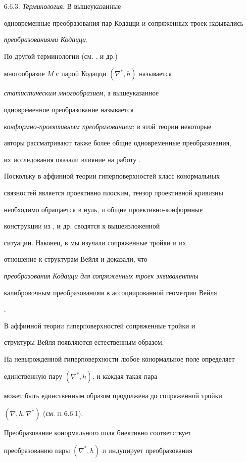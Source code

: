 6.6.3. {\it Терминология}. В \cite{BOK-G-S-2} вышеуказанные

одновременные преобразования пар Кодацци и сопряженных троек назывались

{\it преобразованиями Кодацци}.

По другой терминологии (см. \cite{KUR}, \cite{MAT} и др.)

многообразие $M$ с парой Кодацци $(\nabla ^*, h)$ называется

{\it статистическим многообразием}, а вышеуказанное

одновременное преобразование называется

{\it конформно-проективным преобразованием}; в этой теории некоторые

авторы рассматривают также более общие одновременные преобразования,

их исследования оказали влияние на работу \cite{STE}.

Поскольку в аффинной теории гиперповерхностей класс конормальных

связностей является проективно плоским, тензор проективной кривизны

необходимо обращается в нуль, и общие проективно-конформные

конструкции из \cite{KUR}, \cite{MAT} и др. сводятся к вышеизложенной

ситуации. Наконец, в \cite{BOK-G-S-2} мы изучали сопряженные тройки и их

отношение к структурам Вейля и доказали, что

{\it преобразования Кодацци для сопряженных троек эквивалентны

калибровочным преобразованиям в ассоциированной геометрии Вейля}.



В аффинной теории гиперповерхностей сопряженные тройки и

структуры Вейля появляются естественным образом.

На невырожденной гиперповерхности любое конормальное поле определяет

единственную пару $(\nabla^*, h)$, и каждая такая пара

может быть единственным образом продолжена до сопряженной тройки

$(\nabla, h,\nabla^*)$ (см. п.\,6.6.1).

Преобразование конормального поля биективно соответствует

преобразованию пары $(\nabla ^*, h)$ и индуцирует преобразования

